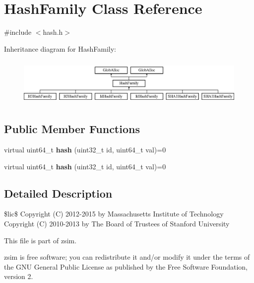 \hypertarget{classHashFamily}{\section{Hash\-Family Class Reference}
\label{classHashFamily}
}


{\ttfamily \#include $<$hash.\-h$>$}

Inheritance diagram for Hash\-Family\-:\begin{figure}[H]
\begin{center}
\leavevmode
\includegraphics[height=2.352941cm]{classHashFamily}
\end{center}
\end{figure}
\subsection*{Public Member Functions}
\begin{DoxyCompactItemize}
\item 
\hypertarget{classHashFamily_adccfa4b4e61886a5b6ffc6e7797367e1}{virtual uint64\-\_\-t {\bfseries hash} (uint32\-\_\-t id, uint64\-\_\-t val)=0}\label{classHashFamily_adccfa4b4e61886a5b6ffc6e7797367e1}

\item 
\hypertarget{classHashFamily_adccfa4b4e61886a5b6ffc6e7797367e1}{virtual uint64\-\_\-t {\bfseries hash} (uint32\-\_\-t id, uint64\-\_\-t val)=0}\label{classHashFamily_adccfa4b4e61886a5b6ffc6e7797367e1}

\end{DoxyCompactItemize}


\subsection{Detailed Description}
\$lic\$ Copyright (C) 2012-\/2015 by Massachusetts Institute of Technology Copyright (C) 2010-\/2013 by The Board of Trustees of Stanford University

This file is part of zsim.

zsim is free software; you can redistribute it and/or modify it under the terms of the G\-N\-U General Public License as published by the Free Software Foundation, version 2.


